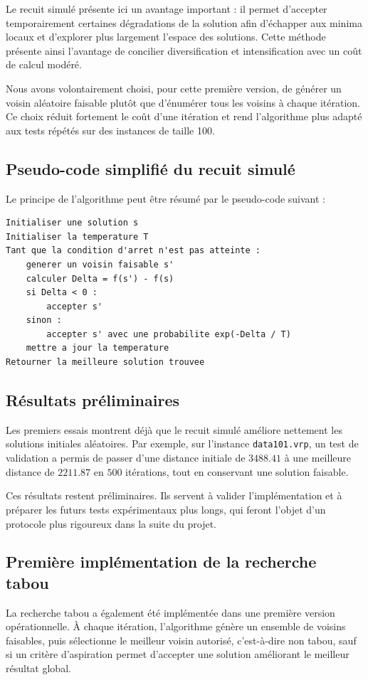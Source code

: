 \documentclass[11pt,a4paper]{article}
\begin{document}
Le recuit simulé présente ici un avantage important : il permet d'accepter temporairement certaines dégradations de la solution afin d'échapper aux minima locaux et d'explorer plus largement l'espace des solutions. Cette méthode présente ainsi l'avantage de concilier diversification et intensification avec un coût de calcul modéré.

Nous avons volontairement choisi, pour cette première version, de générer un voisin aléatoire faisable plutôt que d'énumérer tous les voisins à chaque itération. Ce choix réduit fortement le coût d'une itération et rend l'algorithme plus adapté aux tests répétés sur des instances de taille 100.

\subsection{Pseudo-code simplifié du recuit simulé}
Le principe de l'algorithme peut être résumé par le pseudo-code suivant :

\begin{lstlisting}
Initialiser une solution s
Initialiser la temperature T
Tant que la condition d'arret n'est pas atteinte :
    generer un voisin faisable s'
    calculer Delta = f(s') - f(s)
    si Delta < 0 :
        accepter s'
    sinon :
        accepter s' avec une probabilite exp(-Delta / T)
    mettre a jour la temperature
Retourner la meilleure solution trouvee
\end{lstlisting}

\subsection{Résultats préliminaires}
Les premiers essais montrent déjà que le recuit simulé améliore nettement les solutions initiales aléatoires. Par exemple, sur l'instance \texttt{data101.vrp}, un test de validation a permis de passer d'une distance initiale de \(3488.41\) à une meilleure distance de \(2211.87\) en \(500\) itérations, tout en conservant une solution faisable.

Ces résultats restent préliminaires. Ils servent à valider l'implémentation et à préparer les futurs tests expérimentaux plus longs, qui feront l'objet d'un protocole plus rigoureux dans la suite du projet.

\subsection{Première implémentation de la recherche tabou}
La recherche tabou a également été implémentée dans une première version opérationnelle. À chaque itération, l'algorithme génère un ensemble de voisins faisables, puis sélectionne le meilleur voisin autorisé, c'est-à-dire non tabou, sauf si un critère d'aspiration permet d'accepter une solution améliorant le meilleur résultat global.
\end{document}
